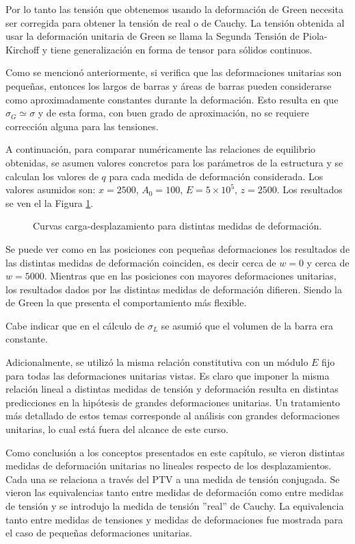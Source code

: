 Por lo tanto las tensión que obtenemos usando la deformación de Green necesita ser corregida para obtener la tensión de real o de Cauchy. La tensión obtenida al usar la deformación unitaria de Green se llama la Segunda Tensión de Piola-Kirchoff y tiene generalización en forma de tensor para sólidos continuos.

Como se mencionó anteriormente, si verifica que las deformaciones unitarias son pequeñas, entonces los largos de barras y áreas de barras pueden considerarse como aproximadamente constantes durante la deformación. Esto resulta en que $\sigma_G \simeq \sigma$ y de esta forma, con buen grado de aproximación, no se requiere corrección alguna para las tensiones.

A continuación, para comparar numéricamente las relaciones de equilibrio obtenidas, se asumen valores concretos para los parámetros de la estructura y se calculan los valores de $q$ para cada medida de deformación considerada. Los valores asumidos son: $x=2500$, $A_0=100$, $E=5\times10^5$, $z=2500$. Los resultados se ven el la Figura \ref{fig:nonlindef}.

\begin{figure}[htb]
	\centering
	\resizebox{.85\textwidth}{!}{}
	\caption{Curvas carga-desplazamiento para distintas medidas de deformación.}
	\label{fig:nonlindef}
\end{figure}


Se puede ver como en las posiciones con pequeñas deformaciones los resultados de las distintas medidas de deformación coinciden, es decir cerca de $w=0$ y cerca de $w=5000$. Mientras que en las posiciones con mayores deformaciones unitarias, los resultados dados por las distintas medidas de deformación difieren. Siendo la de Green la que presenta el comportamiento más flexible.

Cabe indicar que en el cálculo de $\sigma_L$ se asumió que el volumen de la barra era constante.

Adicionalmente, se utilizó la misma relación constitutiva con un módulo $E$ fijo para todas las deformaciones unitarias vistas. Es claro que imponer la misma relación lineal a distintas medidas de tensión y deformación resulta en distintas predicciones en la hipótesis de grandes deformaciones unitarias. Un tratamiento más detallado de estos temas corresponde al análisis con grandes deformaciones unitarias, lo cual está fuera del alcance de este curso.

Como conclusión a los conceptos presentados en este capítulo, se vieron distintas medidas de deformación unitarias no lineales respecto de los desplazamientos. Cada una se relaciona a través del PTV a una medida de tensión conjugada. Se vieron las equivalencias tanto entre medidas de deformación como entre medidas de tensión y se introdujo la medida de tensión ''real'' de Cauchy. La equivalencia tanto entre medidas de tensiones y medidas de deformaciones fue mostrada para el caso de pequeñas deformaciones unitarias.

